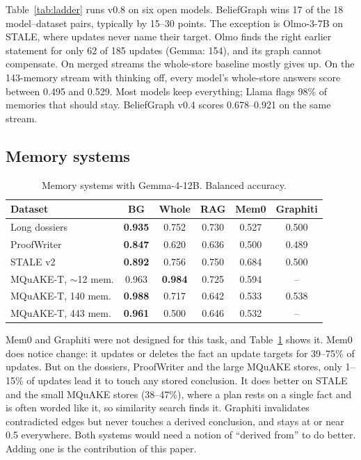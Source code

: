 \documentclass[conference]{IEEEtran}
\begin{document}
Table~\ref{tab:ladder} runs v0.8 on six open models. BeliefGraph wins 17 of the 18 model--dataset pairs, typically by 15--30 points. The exception is Olmo-3-7B on STALE, where updates never name their target. Olmo finds the right earlier statement for only 62 of 185 updates (Gemma: 154), and its graph cannot compensate. On merged streams the whole-store baseline mostly gives up. On the 143-memory stream with thinking off, every model's whole-store answers score between 0.495 and 0.529. Most models keep everything; Llama flags 98\% of memories that should stay. BeliefGraph v0.4 scores 0.678--0.921 on the same stream.

\subsection{Memory systems}

\begin{table}[t]
\caption{Memory systems with Gemma-4-12B. Balanced accuracy.}
\label{tab:memsys}
\centering
\footnotesize
\setlength{\tabcolsep}{3pt}
\begin{tabular}{@{}lccccc@{}}
\toprule
Dataset & BG & Whole & RAG & Mem0 & Graphiti \\
\midrule
Long dossiers & \textbf{0.935} & 0.752 & 0.730 & 0.527 & 0.500 \\
ProofWriter & \textbf{0.847} & 0.620 & 0.636 & 0.500 & 0.489 \\
STALE v2 & \textbf{0.892} & 0.756 & 0.750 & 0.684 & 0.500 \\
MQuAKE-T, $\sim$12 mem. & 0.963 & \textbf{0.984} & 0.725 & 0.594 & -- \\
MQuAKE-T, 140 mem. & \textbf{0.988} & 0.717 & 0.642 & 0.533 & 0.538 \\
MQuAKE-T, 443 mem. & \textbf{0.961} & 0.500 & 0.646 & 0.532 & -- \\
\bottomrule
\end{tabular}
\end{table}

Mem0 and Graphiti were not designed for this task, and Table~\ref{tab:memsys} shows it. Mem0 does notice change: it updates or deletes the fact an update targets for 39--75\% of updates. But on the dossiers, ProofWriter and the large MQuAKE stores, only 1--15\% of updates lead it to touch any stored conclusion. It does better on STALE and the small MQuAKE stores (38--47\%), where a plan rests on a single fact and is often worded like it, so similarity search finds it. Graphiti invalidates contradicted edges but never touches a derived conclusion, and stays at or near 0.5 everywhere. Both systems would need a notion of ``derived from'' to do better. Adding one is the contribution of this paper.
\end{document}
